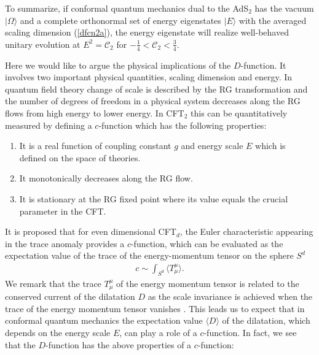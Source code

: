 \documentclass[12pt]{article}
\numberwithin{equation}{section}
\begin{document}
To summarize, 
if conformal quantum mechanics dual to the AdS$_{2}$ 
has the vacuum $|\Omega\rangle$ and a complete orthonormal set of energy eigenstates $|E\rangle$ 
with the averaged scaling dimension (\ref{dfcn2a}), 
the energy eigenstate will realize well-behaved unitary evolution at $E^{2}=\mathcal{C}_{2}$ 
for $-\frac14<\mathcal{C}_{2}<\frac34$. 



Here we would like to argue the physical implications of the $D$-function. 
It involves two important physical quantities, scaling dimension and energy. 
In quantum field theory change of scale is described by the RG transformation 
and the number of degrees of freedom in a physical system decreases along the RG flows 
from high energy to lower energy.  
In CFT$_{2}$ this can be quantitatively measured by defining a $c$-function \cite{Zamolodchikov:1986gt} 
which has the following properties:  
\begin{enumerate}
\item It is a real function of coupling constant $g$ and energy scale $E$ which is defined on the space of theories. 
\item It monotonically decreases along the RG flow. 
\item It is stationary at the RG fixed point where its value equals the crucial parameter in the CFT. 
\end{enumerate}
It is proposed \cite{Cardy:1988cwa} that 
for even dimensional CFT$_{d}$, 
the Euler characteristic appearing 
in the trace anomaly provides a $c$-function,  
which can be evaluated as the expectation value of the trace of the energy-momentum tensor on the sphere $S^{d}$
\begin{align}
\label{cfn1}
c\sim \int_{S^{d}}\langle T_{\mu}^{\mu}\rangle. 
\end{align}
We remark that the trace $T^{\mu}_{\mu}$ of the energy momentum tensor is related to 
the conserved current of the dilatation $D$  
as the scale invariance is achieved  
when the trace of the energy momentum tensor vanishes 
\cite{Coleman:1970je}. 
This leads us to expect that 
in conformal quantum mechanics 
the expectation value $\langle D\rangle$ of the dilatation, 
which depends on the energy scale $E$, 
can play a role of a $c$-function. 
In fact, we see that the $D$-function has the above properties of a $c$-function: 
%
\end{document}
